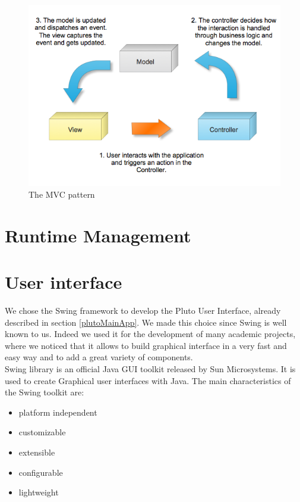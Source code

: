\begin{figure}[H]
\centering
\includegraphics[width=\linewidth]
{pictures/MVC.png}
  \caption{The MVC pattern}
  \label{fig:mvc}
\end{figure}

\section{Runtime Management}\label{runtimeMng}









\section{User interface}\label{interface}

We chose the Swing framework to develop the Pluto User Interface, already described in section \ref{plutoMainApp}.
We made this choice since Swing is well known to us.
Indeed we used it for the development of many academic projects, where we noticed that it allows to build graphical interface in a very fast and easy way and to add a great variety of components.
\\

Swing library is an official Java GUI toolkit released by Sun Microsystems. It is used to create Graphical user interfaces with Java.
The main characteristics of the Swing toolkit are:
\begin{itemize}
\item platform independent
\item customizable
\item extensible
\item configurable
\item lightweight
\end{itemize}

